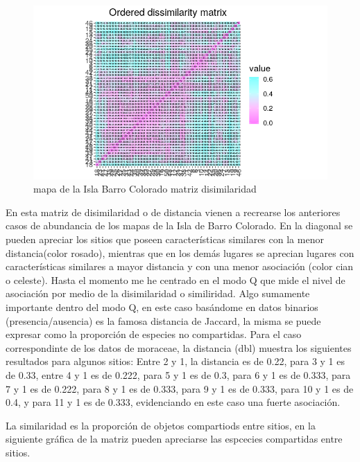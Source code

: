 \documentclass[11pt,]{article}
\begin{document}
\begin{figure}
\centering
\includegraphics[width=1.00000\textwidth]{matrizdedisimilaridad.png}
\caption{mapa de la Isla Barro Colorado matriz disimilaridad
\label{fig:bci_map}}
\end{figure}

En esta matriz de disimilaridad o de distancia vienen a recrearse los
anteriores casos de abundancia de los mapas de la Isla de Barro
Colorado. En la diagonal se pueden apreciar los sitios que poseen
características similares con la menor distancia(color rosado), mientras
que en los demás lugares se aprecian lugares con características
similares a mayor distancia y con una menor asociación (color cian o
celeste). Hasta el momento me he centrado en el modo Q que mide el nivel
de asociación por medio de la disimilaridad o similiridad. Algo
sumamente importante dentro del modo Q, en este caso basándome en datos
binarios (presencia/ausencia) es la famosa distancia de Jaccard, la
misma se puede expresar como la proporción de especies no compartidas.
Para el caso correspondinte de los datos de moraceae, la distancia (dbl)
muestra los siguientes resultados para algunos sitios: Entre 2 y 1, la
distancia es de 0.22, para 3 y 1 es de 0.33, entre 4 y 1 es de 0.222,
para 5 y 1 es de 0.3, para 6 y 1 es de 0.333, para 7 y 1 es de 0.222,
para 8 y 1 es de 0.333, para 9 y 1 es de 0.333, para 10 y 1 es de 0.4, y
para 11 y 1 es de 0.333, evidenciando en este caso una fuerte
asociación.

La similaridad es la proporción de objetos compartiods entre sitios, en
la siguiente gráfica de la matriz pueden apreciarse las espcecies
compartidas entre sitios.
\end{document}

